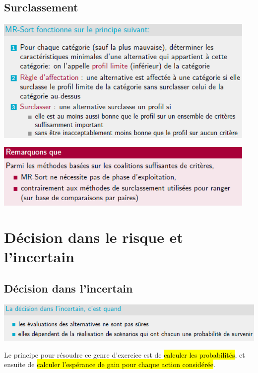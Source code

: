 \documentclass[a4paper, 12pt]{article}
\newcommand{\alinea}{
\hspace*{0.5cm}}
\begin{document}
	\subsection{Surclassement}
		\begin{center}
			\includegraphics[width=5in]{Images/mr_sort}
		\end{center}
		\begin{center}
			\includegraphics[width=5in]{Images/mr_sort_note}
		\end{center}
%
\section{Décision dans le risque et l'incertain}
	\subsection{Décision dans l'incertain}
		\begin{center}
			\includegraphics[width=6in]{Images/incertain}
		\end{center}
		\alinea Le principe pour résoudre ce genre d'exercice est de \hl{calculer les probabilités}, et ensuite de \hl{calculer
			l'espérance de gain pour chaque action considérée}.
\end{document}
